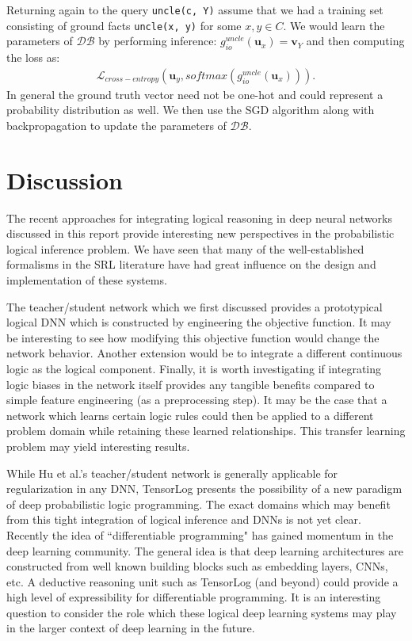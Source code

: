 \documentclass[11pt]{article}
\begin{document}
Returning again to the query \verb!uncle(c, Y)! assume that we had a training set consisting of ground facts \verb!uncle(x, y)! for some $x, y \in C$.  We would learn the parameters of $\mathcal{DB}$ by performing inference: $g_{io}^{uncle}(\textbf{u}_x) = \textbf{v}_Y$ and then computing the loss as:
\begin{gather*}
\mathcal{L}_{cross-entropy}(\textbf{u}_y, softmax(g_{io}^{uncle}(\textbf{u}_x))).
\end{gather*}
In general the ground truth vector need not be one-hot and could represent a probability distribution as well.  We then use the SGD algorithm along with backpropagation to update the parameters of $\mathcal{DB}$.

\section{Discussion}
The recent approaches for integrating logical reasoning in deep neural networks discussed in this report provide interesting new perspectives in the probabilistic logical inference problem.  We have seen that many of the well-established formalisms in the SRL literature have had great influence on the design and implementation of these systems.

The teacher/student network which we first discussed provides a prototypical logical DNN which is constructed by engineering the objective function.  It may be interesting to see how modifying this objective function would change the network behavior.  Another extension would be to integrate a different continuous logic as the logical component.  Finally, it is worth investigating if integrating logic biases in the network itself provides any tangible benefits compared to simple feature engineering (as a preprocessing step).  It may be the case that a network which learns certain logic rules could then be applied to a different problem domain while retaining these learned relationships.  This transfer learning problem may yield interesting results.

While Hu et al.'s teacher/student network is generally applicable for regularization in any DNN, TensorLog presents the possibility of a new paradigm of deep probabilistic logic programming.  The exact domains which may benefit from this tight integration of logical inference and DNNs is not yet clear.  Recently the idea of ``differentiable programming" has gained momentum in the deep learning community.  The general idea is that deep learning architectures are constructed from well known building blocks such as embedding layers, CNNs, etc.  A deductive reasoning unit such as TensorLog (and beyond) could provide a high level of expressibility for differentiable programming.  It is an interesting question to consider the role which these logical deep learning systems may play in the larger context of deep learning in the future.
\end{document}
